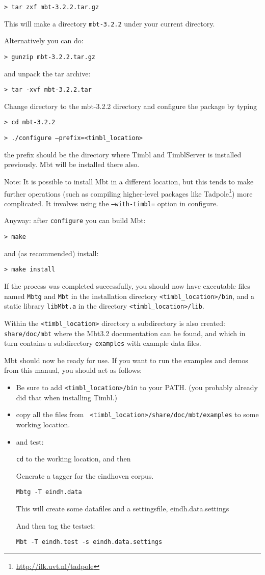 \documentclass{report}
\begin{document}
{\tt > tar zxf mbt-3.2.2.tar.gz}

This will make a directory {\tt mbt-3.2.2} under your current directory.

Alternatively you can do:

{\tt > gunzip mbt-3.2.2.tar.gz}

and unpack the tar archive:

{\tt > tar -xvf mbt-3.2.2.tar}

Change directory to the mbt-3.2.2 directory and configure the package by typing

{\tt > cd mbt-3.2.2}

{\tt > ./configure --prefix=<timbl\_location>}

the prefix should be the directory where Timbl and TimblServer is installed previously. Mbt will be installed there also.

Note: It is possible to install Mbt in a different location, but this
tends to make further operations (such as compiling higher-level
packages like Tadpole\footnote{\url{http://ilk.uvt.nl/tadpole}}) more complicated. It involves using the
{\tt --with-timbl=} option in configure. 
 
Anyway: after {\tt configure} you can build Mbt:

{\tt > make}

and (as recommended) install:

{\tt > make install }

If the process was completed successfully, you should now have
executable files named {\tt Mbtg} and {\tt Mbt} in the installation directory
{\tt <timbl\_location>/bin}, and a static library {\tt libMbt.a} in
the directory {\tt <timbl\_location>/lib}.

Within the {\tt <timbl\_location>} directory a subdirectory is
also created: {\tt share/doc/mbt} where the Mbt3.2 documentation
can be found, and which in turn contains a subdirectory {\tt examples}
with example data files.

Mbt should now be ready for use. If you want to run the examples and
demos from this manual, you should act as follows:

\begin{itemize}
\item Be sure to add {\tt <timbl\_location>/bin} to your PATH. (you
  probably already did that when installing Timbl.)
\item copy all the files from {\tt
  <timbl\_location>/share/doc/mbt/examples} to some working
location. 
\item and test:

{\tt cd} to the working location, and then

Generate a tagger for the eindhoven corpus.

{\tt Mbtg -T eindh.data}

This will create some datafiles and a settingsfile,
eindh.data.settings

And then tag the testset:

{\tt Mbt -T eindh.test -s eindh.data.settings}
\end{itemize}
\end{document}
